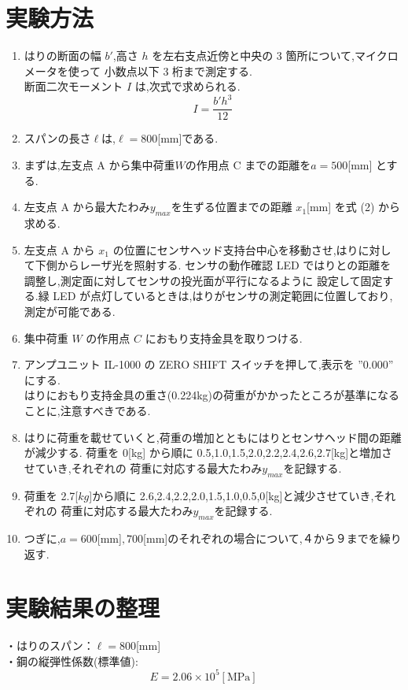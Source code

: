 \documentclass[a4paper,11pt]{jsarticle}
\begin{document}
\section{実験方法}
\begin{enumerate}
  \item はりの断面の幅 $b'$,高さ $h$ を左右支点近傍と中央の 3 箇所について,マイクロメータを使って
        小数点以下 3 桁まで測定する.\\
        \quad 断面二次モーメント $I$ は,次式で求められる.
        \begin{equation}
          I = {\dfrac{b'h^3}{12}}
        \end{equation}
  \item スパンの長さ$ \ell $は,$\ell= 800$[mm]である.
  \item まずは,左支点 A から集中荷重$ W $の作用点 C までの距離を$a = 500$[mm] とする.
  \item 左支点 A から最大たわみ$y_{max}$を生ずる位置までの距離 $x_1$[mm] を式 (2) から求める.
  \item 左支点 A から $x_1$ の位置にセンサヘッド支持台中心を移動させ,はりに対して下側からレーザ光を照射する.
        センサの動作確認 LED ではりとの距離を調整し,測定面に対してセンサの投光面が平行になるように
        設定して固定する.緑 LED が点灯しているときは,はりがセンサの測定範囲に位置しており,測定が可能である.
  \item  集中荷重 $W$ の作用点 $C$ におもり支持金具を取りつける.
  \item アンプユニット IL-1000 の ZERO SHIFT スイッチを押して,表示を ”0.000” にする.\\
        はりにおもり支持金具の重さ(0.224kg)の荷重がかかったところが基準になることに,注意すべきである.
  \item はりに荷重を載せていくと,荷重の増加とともにはりとセンサヘッド間の距離が減少する.
        荷重を 0[kg] から順に 0.5,1.0,1.5,2.0,2.2,2.4,2.6,2.7[kg]と増加させていき,それぞれの
        荷重に対応する最大たわみ$y_{max}$を記録する.
  \item 荷重を 2.7[$kg$]から順に 2.6,2.4,2.2,2.0,1.5,1.0,0.5,0[kg]と減少させていき,それぞれの
        荷重に対応する最大たわみ$y_{max}$を記録する.
  \item つぎに,$a= 600$[mm]$,700$[mm]のそれぞれの場合について,４から９までを繰り返す.
\end{enumerate}

\section{実験結果の整理}
・はりのスパン：$\ell= 800$[mm]\\
\quad・鋼の縦弾性係数(標準値):
\begin{equation}
  E = 2.06 \times 10^5 [\text{MPa}]
\end{equation}
\end{document}
